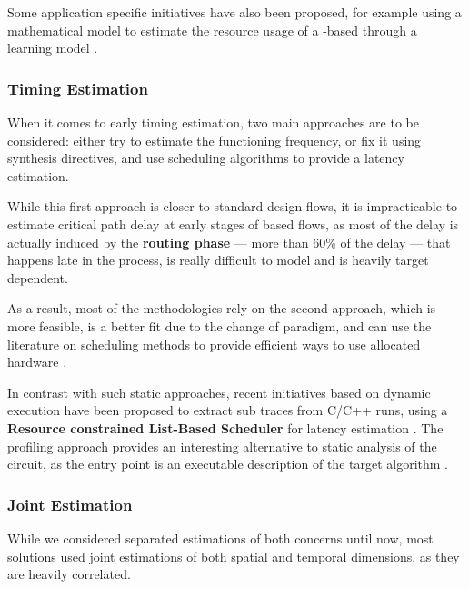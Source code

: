             Some application specific initiatives have also been proposed, for example using a mathematical model to estimate the resource usage of a -based  through a learning model \cite{fresse2014mathematical}.

         \subsubsection{Timing Estimation}
            When it comes to early timing estimation, two main approaches are to be considered: either try to estimate the functioning frequency, or fix it using synthesis directives, and use scheduling algorithms to provide a latency estimation.

            While this first approach is closer to standard design flows, it is impracticable to estimate critical path delay at early stages of  based flows, as most of the delay is actually induced by the {\bf routing phase} --- more than 60\% of the delay \cite{xu_area_1996} --- that happens late in the process, is really difficult to model and is heavily target dependent.

            As a result, most of the  methodologies rely on the second approach, which is more feasible, is a better fit due to the change of paradigm, and can use the literature on scheduling methods to provide efficient ways to use allocated hardware \cite{prost-boucle_fast_2014}\cite{rincon_technique_2020}.

            In contrast with such static approaches, recent initiatives based on dynamic execution have been proposed to extract sub traces from C/C++ runs, using a {\bf Resource constrained List-Based Scheduler} for latency estimation \cite{zhong_lin-analyzer_2016}\cite{siracusa_comprehensive_2021}.
            The profiling approach provides an interesting alternative to static analysis of the circuit, as the entry point is an executable description of the target algorithm \cite{oneal_hlspredict_2018}.

        \subsubsection{Joint Estimation}
            While we considered separated estimations of both concerns until now, most solutions used joint estimations of both spatial and temporal dimensions, as they are heavily correlated.

